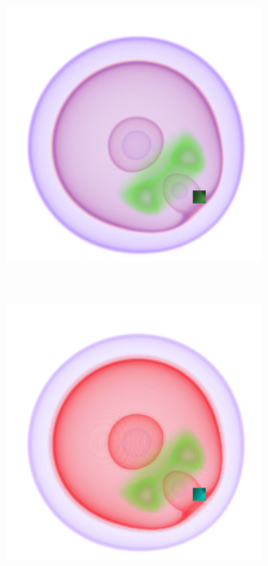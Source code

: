 \documentclass[twoside,twocolumn,10pt]{article}
\begin{document}
\begin{figure}[t]
	\begin{minipage}{.2\textwidth}
		\centering
		\includegraphics[width=1\linewidth]{nucleon_2_color_crop}
		\label{fig:nucleon_2_color}
	\end{minipage}~
	\begin{minipage}{.2\textwidth}
		\centering
		\includegraphics[width=1\linewidth]{nucleon_2_alpha_crop}

\end{minipage}
\end{figure}
\end{document}
